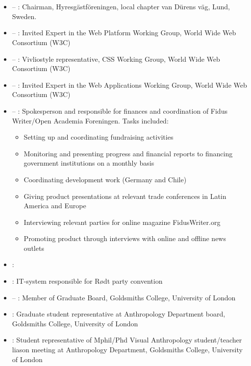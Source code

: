 \section*{\organizationexperience}

\begin{itemize}
\item {} – : Chairman, Hyresgästföreningen, local chapter van Dürens väg, Lund, Sweden.
\item {} – : Invited Expert in the Web Platform Working Group, World Wide Web Consortium (W3C)
\item {} – : Vivliostyle representative, CSS Working Group, World Wide Web Consortium (W3C)
\item {} –  : Invited Expert in the Web Applications Working Group, World Wide Web Consortium (W3C)
\item {} – : Spokesperson and responsible for finances and coordination of Fidus Writer/Open Academia Foreningen. Tasks included:
\begin{itemize}
\item Setting up and coordinating fundraising activities
\item Monitoring and presenting progress and financial reports to financing government institutions on a monthly basis
\item Coordinating development work (Germany and Chile)
\item Giving product presentations at relevant trade conferences in Latin America and Europe
\item Interviewing relevant parties for online magazine FidusWriter.org
\item Promoting product through interviews with online and offline news outlets
\end{itemize}
\item {}: 
\item {}: IT-system responsible for Rødt party convention
\item {} –  : Member of Graduate Board, Goldsmiths College, University of London
\item {}: Graduate student representative at Anthropology Department board, Goldsmiths College, University of London
\item {}: Student representative of Mphil/Phd Visual Anthropology student/teacher liason meeting at Anthropology Department, Goldsmiths College, University of London

\end{itemize}
